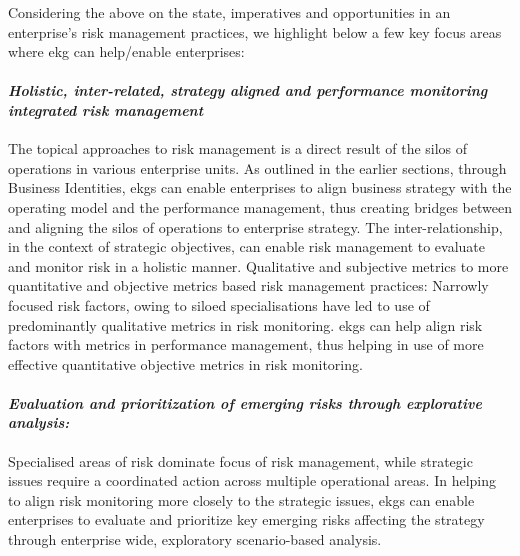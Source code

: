 %
%
Considering the above on the state, imperatives and opportunities in an enterprise’s risk management practices,
we highlight below a few key focus areas where \gls{ekg} can help/enable enterprises:

\paragraph*{\textit{Holistic, inter-related, strategy aligned and performance monitoring integrated risk management}}

The topical approaches to risk management is a direct result of the silos of operations in various enterprise units.
As outlined in the earlier sections, through Business Identities,
\glspl{ekg} can enable enterprises to align business strategy with the operating model and the performance management,
thus creating bridges between and aligning the silos of operations to enterprise strategy.
The inter-relationship, in the context of strategic objectives,
can enable risk management to evaluate and monitor risk in a holistic manner.
Qualitative and subjective metrics to more quantitative and objective metrics based risk management practices:
Narrowly focused risk factors, owing to siloed specialisations have led to use of predominantly qualitative metrics
in risk monitoring.
\Glspl{ekg} can help align risk factors with metrics in performance management,
thus helping in use of more effective quantitative objective metrics in risk monitoring.

\paragraph*{\textit{Evaluation and prioritization of emerging risks through explorative analysis:}}

Specialised areas of risk dominate focus of risk management, while strategic issues require a coordinated action
across multiple operational areas.
In helping to align risk monitoring more closely to the strategic issues,
\glspl{ekg} can enable enterprises to evaluate and prioritize key emerging risks affecting the strategy
through enterprise wide, exploratory scenario-based analysis.
